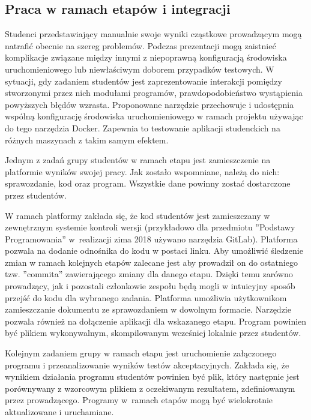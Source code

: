 \subsection{Praca w ramach etapów i integracji}
\label{work_in_stages_and_integrations}


Studenci przedstawiający manualnie swoje wyniki cząstkowe prowadzącym mogą natrafić obecnie na szereg problemów.
Podczas prezentacji mogą zaistnieć komplikacje związane między innymi z niepoprawną konfiguracją środowiska uruchomieniowego lub niewłaściwym doborem przypadków testowych.
W sytuacji, gdy zadaniem studentów jest zaprezentowanie interakcji pomiędzy stworzonymi przez nich modułami programów, prawdopodobieństwo wystąpienia powyższych błędów wzrasta.
Proponowane narzędzie przechowuje i udostępnia wspólną konfigurację środowiska uruchomieniowego w ramach projektu używając do tego narzędzia Docker.
Zapewnia to testowanie aplikacji studenckich na różnych maszynach z takim samym efektem.

Jednym z zadań grupy studentów w ramach etapu jest zamieszczenie na platformie wyników swojej pracy.
Jak zostało wspomniane, należą do nich: sprawozdanie, kod oraz program.
Wszystkie dane powinny zostać dostarczone przez studentów.

W ramach platformy zakłada się, że kod studentów jest zamieszczany w zewnętrznym systemie kontroli wersji (przykładowo dla przedmiotu ”Podstawy Programowania” w~realizacji zima 2018 używano narzędzia GitLab).
Platforma pozwala na dodanie odnośnika do kodu w postaci linku.
Aby umożliwić śledzenie zmian w ramach kolejnych etapów zalecane jest aby prowadził on do ostatniego tzw. ”commita” zawierającego zmiany dla danego etapu.
Dzięki temu zarówno prowadzący, jak i pozostali członkowie zespołu będą mogli w intuicyjny sposób przejść do kodu dla wybranego zadania.
Platforma umożliwia użytkownikom zamieszczanie dokumentu ze sprawozdaniem w dowolnym formacie.
Narzędzie pozwala również na dołączenie aplikacji dla wskazanego etapu.
Program powinien być plikiem wykonywalnym, skompilowanym wcześniej lokalnie przez studentów.

Kolejnym zadaniem grupy w ramach etapu jest uruchomienie załączonego programu i przeanalizowanie wyników testów akceptacyjnych.
Zakłada się, że wynikiem działania programu studentów powinien być plik, który następnie jest porównywany z wzorcowym plikiem z oczekiwanym rezultatem, zdefiniowanym przez prowadzącego.
Programy w~ramach etapów mogą być wielokrotnie aktualizowane i uruchamiane.


